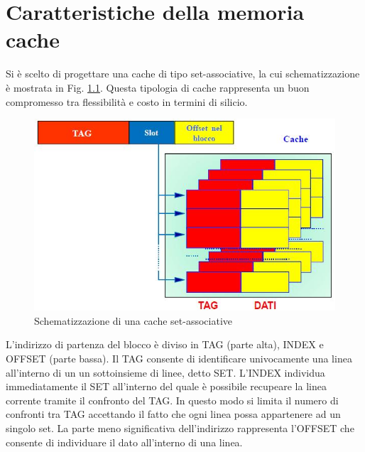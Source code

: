 \clearpage{\pagestyle{empty}\cleardoublepage}
\chapter{Caratteristiche della memoria cache}


Si \`e scelto di progettare una cache di tipo set-associative, la cui schematizzazione \`e mostrata in Fig. \ref{fig:set_ass}.
Questa tipologia di cache rappresenta un buon compromesso tra flessibilit\`a e costo in termini di silicio.

\begin{figure}[!h]
\centering
\includegraphics[width=\textwidth]{img/set-associative.jpg}
\caption{Schematizzazione di una cache set-associative}
\label{fig:set_ass}
\end{figure}


L'indirizzo di partenza del blocco \`e diviso in TAG (parte alta), INDEX e OFFSET (parte bassa).
Il TAG consente di identificare univocamente una linea all'interno di un un sottoinsieme di linee, detto SET.
L'INDEX individua immediatamente il SET all'interno del quale \`e possibile recupeare la linea corrente tramite il confronto del TAG.
In questo modo si limita il numero di confronti tra TAG accettando il fatto che ogni linea possa appartenere ad un singolo set.
La parte meno significativa dell'indirizzo rappresenta l'OFFSET che consente di individuare il dato all'interno di una linea.\\

